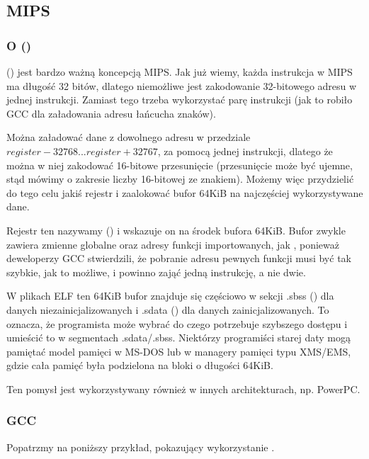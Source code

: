\subsection{MIPS}

\subsubsection{O  ()}
\label{MIPS_GP}

 () jest bardzo ważną koncepcją MIPS.
Jak już wiemy, każda instrukcja w MIPS ma długość 32 bitów, dlatego niemożliwe jest  zakodowanie 32-bitowego adresu w jednej instrukcji. Zamiast tego trzeba wykorzystać parę instrukcji
(jak to robiło GCC dla załadowania adresu łańcucha znaków).

Można załadować dane z dowolnego adresu w przedziale $register-32768...register+32767$, za pomocą jednej instrukcji, dlatego że można w niej zakodować 16-bitowe
przesunięcie (przesunięcie może być ujemne, stąd mówimy o zakresie liczby 16-bitowej ze znakiem).
Możemy więc przydzielić do tego celu jakiś rejestr i zaalokować bufor 64KiB na najczęściej wykorzystywane dane.

Rejestr ten nazywamy  () i wskazuje on na środek bufora 64KiB.
Bufor zwykle zawiera zmienne globalne oraz adresy funkcji importowanych, jak \printf, ponieważ deweloperzy GCC stwierdzili, że pobranie adresu pewnych funkcji musi być tak szybkie, jak to możliwe, i powinno zająć jedną instrukcję, a nie dwie.

W plikach ELF ten 64KiB bufor znajduje się częściowo w sekcji .sbss () dla danych niezainicjalizowanych i .sdata () dla danych zainicjalizowanych.
To oznacza, że programista może wybrać do czego potrzebuje szybszego dostępu i umieścić to
w segmentach .sdata/.sbss.
Niektórzy programiści starej daty mogą pamiętać model pamięci w MS-DOS 
lub w managery pamięci typu XMS/EMS, gdzie cała pamięć była podzielona na bloki o długości 64KiB.

Ten pomysł jest wykorzystywany również w innych architekturach, np. PowerPC.

\subsubsection{\Optimizing GCC}

Popatrzmy na poniższy przykład, pokazujący wykorzystanie .

